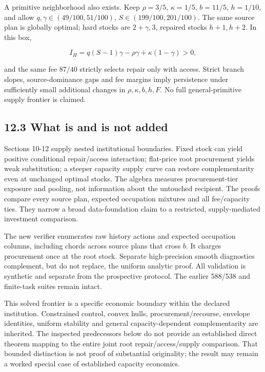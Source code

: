 \documentclass[
  11pt,
  a4paper,
]{article}
\begin{document}
A primitive neighborhood also exists. Keep \(\rho=3/5\), \(\kappa=1/5\),
\(b=11/5\), \(h=1/10\), and allow \(q,\gamma\in(49/100,51/100)\),
\(S\in(199/100,201/100)\). The same source plan is globally optimal;
hard stocks are \(2+\gamma,3\), repaired stocks \(h+1,h+2\). In this
box,

\[I_H=q(S-1)\gamma-\rho\gamma+\kappa(1-\gamma)>0,\tag{76}\]

and the same fee \(87/40\) strictly selects repair only with access.
Strict branch slopes, source-dominance gaps and fee margins imply
persistence under sufficiently small additional changes in
\(\rho,\kappa,b,h,F\). No full general-primitive supply frontier is
claimed.

\hypertarget{what-is-and-is-not-added}{%
\subsection{12.3 What is and is not
added}\label{what-is-and-is-not-added}}

Sections 10-12 supply nested institutional boundaries. Fixed stock can
yield positive conditional repair/access interaction; flat-price root
procurement yields weak substitution; a steeper capacity supply curve
can restore complementarity even at unchanged optimal stocks. The
algebra measures procurement-tier exposure and pooling, not information
about the untouched recipient. The proofs compare every source plan,
expected occupation mixtures and all fee/capacity ties. They narrow a
broad data-foundation claim to a restricted, supply-mediated investment
comparison.

The new verifier enumerates raw history actions and expected occupation
columns, including chords across source plans that cross \(b\). It
charges procurement once at the root stock. Separate high-precision
smooth diagnostics complement, but do not replace, the uniform analytic
proof. All validation is synthetic and separate from the prospective
protocol. The earlier 588/538 and finite-task suites remain intact.

This solved frontier is a specific economic boundary within the declared
institution. Constrained control, convex hulls, procurement/recourse,
envelope identities, uniform stability and general capacity-dependent
complementarity are inherited. The inspected predecessors below do not
provide an established direct theorem mapping to the entire joint root
repair/access/supply comparison. That bounded distinction is not proof
of substantial originality; the result may remain a worked special case
of established capacity economics.
\end{document}
